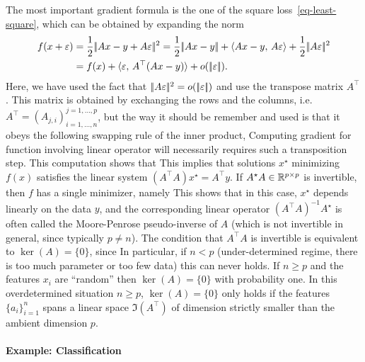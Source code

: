 The most important gradient formula is the one of the square loss~\eqref{eq-least-square}, which can be obtained by expanding the norm
\begin{align*}
	f(x+\epsilon) &= \frac{1}{2}\norm{Ax-y+A\epsilon}^2 = \frac{1}{2}\norm{Ax-y} + \dotp{Ax-y}{A\epsilon} + \frac{1}{2}\norm{A\epsilon}^2 \\
		&=f(x) + \dotp{\epsilon}{A^\top(Ax-y)} + o(\norm{\epsilon}).
\end{align*} 
Here, we have used the fact that $|\!| A\varepsilon |\!|^2 = o(|\!| \varepsilon |\!|)$ and use the transpose matrix $A^\top$. 
%
This matrix is obtained by exchanging the rows and the columns, i.e. $A^\top = (A_{j,i})_{i=1,\ldots,n}^{j=1,\ldots,p}$, but the way it should be remember and used is that it obeys the following swapping rule of the inner product, 
Computing gradient for function involving linear operator will necessarily requires such a transposition step.
%
This computation shows that
This implies that solutions $x^\star$ minimizing $f(x)$ satisfies the linear system $(A^\top A) x^\star = A^\top y$. 
%
If $A^\star A \in \mathbb{R}^{p \times p}$ is invertible, then $f$ has a single minimizer, namely  
This shows that in this case, $x^\star$ depends linearly on the data $y$, and the corresponding linear operator $(A^\top A)^{-1} A^\star$ is often called the Moore-Penrose pseudo-inverse of $A$ (which is not invertible in general, since typically $p \neq n$). 
%
The condition that $A^\top A$ is invertible is equivalent to $\ker(A)=\{0\}$, since 
In particular, if $n<p$ (under-determined regime, there is too much parameter or too few data) this can never holds. If $n \geq p$ and the features $x_i$ are ``random'' then $\ker(A)=\{0\}$ with probability one. In this overdetermined situation $n \geq p$,  $\ker(A)=\{0\}$ only holds if the features $\{a_i\}_{i=1}^n$ spans a linear space $\Im(A^\top)$ of dimension strictly smaller than the ambient dimension $p$. 

\paragraph{Example: Classification}

